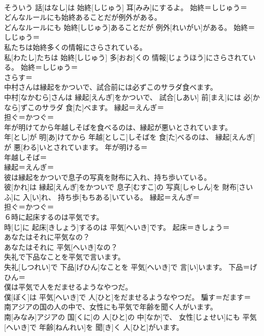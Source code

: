 \documentclass[8pt]{extreport}
\begin{document}
\begin{CJK}{UTF8}{min}
\\	そういう 話[はなし]は 始終[しじゅう] 耳[みみ]にするよ。	始終＝しじゅう＝ 
\\	どんなルールにも始終あることだが例外がある。	
\\	どんなルールにも 始終[しじゅう]あることだが 例外[れいがい]がある。	始終＝しじゅう＝ 
\\	私たちは始終多くの情報にさらされている。	
\\	私[わたし]たちは 始終[しじゅう] 多[おお]くの 情報[じょうほう]にさらされている。	始終＝しじゅう＝ 
\\	さらす＝ 
\\	中村さんは縁起をかついで、試合前には必ずこのサラダ食べます。	
\\	中村[なかむら]さんは 縁起[えんぎ]をかついで、 試合[しあい] 前[まえ]には 必[かなら]ずこのサラダ 食[た]べます。	縁起＝えんぎ＝ 
\\	担ぐ＝かつぐ＝ 
\\	年が明けてから年越しそばを食べるのは、縁起が悪いとされています。	
\\	年[とし]が 明[あ]けてから 年越[としこ]しそばを 食[た]べるのは、 縁起[えんぎ]が 悪[わる]いとされています。	年が明ける＝ 
\\	年越しそば＝ 
\\	縁起＝えんぎ＝ 
\\	彼は縁起をかついで息子の写真を財布に入れ、持ち歩いている。	
\\	彼[かれ]は 縁起[えんぎ]をかついで 息子[むすこ]の 写真[しゃしん]を 財布[さいふ]に 入[い]れ、 持ち歩[もちある]いている。	縁起＝えんぎ＝ 
\\	担ぐ＝かつぐ＝ 
\\	６時に起床するのは平気です。	
\\	時[じ]に 起床[きしょう]するのは 平気[へいき]です。	起床＝きしょう＝ 
\\	あなたはそれに平気なの？	
\\	あなたはそれに 平気[へいき]なの？	
\\	失礼で下品なことを平気で言います。	
\\	失礼[しつれい]で 下品[げひん]なことを 平気[へいき]で 言[い]います。	下品＝げひん＝ 
\\	僕は平気で人をだませるようなやつだ。	
\\	僕[ぼく]は 平気[へいき]で 人[ひと]をだませるようなやつだ。	騙す＝だます＝ 
\\	南アジアの国の人の中で、女性にも平気で年齢を聞く人がいます。	
\\	南[みなみ]アジアの 国[くに]の 人[ひと]の 中[なか]で、 女性[じょせい]にも 平気[へいき]で 年齢[ねんれい]を 聞[き]く 人[ひと]がいます。	

\end{CJK}
\end{document}
